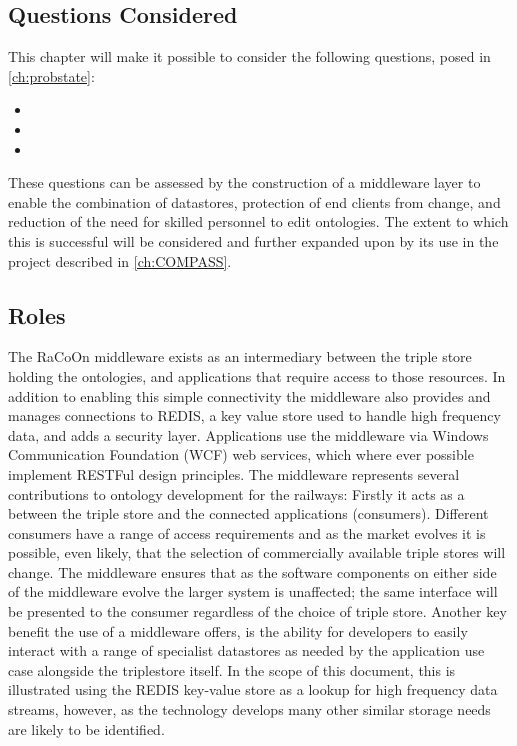 \subsection{Questions Considered}

This chapter will make it possible to consider the following questions, posed in \autoref{ch:probstate}:
\begin{itemize}
\item \QuestionCombine
\item \QuestionChange
\item \QuestionSkillz
\end{itemize}

These questions can be assessed by the construction of a middleware layer to enable the combination of datastores, protection of end clients from change, and reduction of the need for skilled personnel to edit ontologies. The extent to which this is successful will be considered and further expanded upon by its use in the project described in \autoref{ch:COMPASS}.

\subsection{Roles}
The RaCoOn middleware exists as an intermediary between the triple store holding the ontologies, and applications that require access to those resources. In addition to enabling this simple connectivity the middleware also provides and manages connections to REDIS, a key value store used to handle high frequency data, and adds a security layer. Applications use the middleware via Windows Communication Foundation (WCF) web services, which where ever possible implement RESTFul design principles. The middleware represents several contributions to ontology development for the railways: Firstly it acts as a  between the triple store and the connected applications (consumers). Different consumers have a range of access requirements and as the market evolves it is possible, even likely, that the selection of commercially available triple stores will change. The middleware ensures that as the software components on either side of the middleware evolve the larger system is unaffected; the same interface will be presented to the consumer regardless of the choice of triple store. Another key benefit the use of a middleware offers, is the ability for developers to easily interact with a range of specialist datastores as needed by the application use case alongside the triplestore itself. In the scope of this document, this is illustrated using the REDIS key-value store as a lookup for high frequency data streams, however, as the technology develops many other similar storage needs are likely to be identified.

